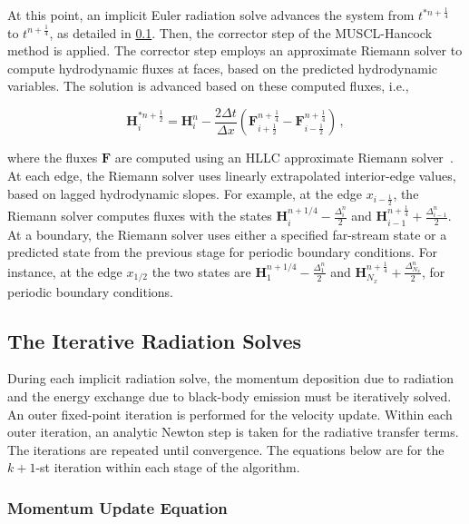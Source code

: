 \documentclass[preprint,12pt]{elsarticle}
\newcommand{\pec}{\, ,}
\newcommand{\half}{\frac{1}{2}}
\newcommand{\fourth}{\frac{1}{4}}
\renewcommand{\H}{\mathbf{H}}
\newcommand{\Flux}{\mathbf{F}}
\newcommand{\dt}{\Delta t}
\newcommand{\dx}{\Delta x}
\newcommand{\hydroCorrector}[5]{
\begin{equation}#5
  \H_i^{#3} = \H_i^{#1} - \frac{#4\dt}{\dx}
  \left(\Flux_{i+\half}^{#2} - \Flux_{i-\half}^{#2}\right) \pec
\end{equation}
}
\begin{document}
At this point, an implicit Euler radiation solve advances the system from $t^{*n+\fourth}$
to $t^{n+\fourth}$, as detailed in \ref{sec:rad_solves}.  Then, the corrector step of the
MUSCL-Hancock method is applied.  The corrector step employs an approximate Riemann solver
to compute hydrodynamic fluxes at faces, based on the predicted hydrodynamic variables.  The solution is
advanced based on these computed fluxes, i.e.,
\hydroCorrector{n}{n+\fourth}{*n+\half}{2}{\label{eq:muscl_corrector}}
where the fluxes $\mathbf{F}$ are computed using an HLLC approximate Riemann solver~\cite{toro}.  At
each edge, the Riemann solver uses linearly extrapolated interior-edge values, based on lagged
hydrodynamic slopes.  For example, at the edge
$x_{i-\half}$, the Riemann solver computes fluxes with the states
$\H_{i}^{n+1/4}-\frac{\Delta_i^n}{2}$ and $\H_{i-1}^{n+\fourth}+\frac{\Delta_{i-1}^n}{2}$.  At a boundary,
the Riemann solver uses either a specified far-stream state or a predicted state from the previous stage for periodic boundary conditions.  For instance,
at the edge $x_{1/2}$ the two states are $\H_{1}^{n+1/4} - \frac{\Delta_1^n}{2}$ and
$\H_{N_x}^{n+\fourth}+\frac{\Delta_{N_x}^{n}}{2}$, for periodic 
boundary conditions.

\subsection{The Iterative Radiation Solves}
\label{sec:rad_solves}

During each implicit radiation solve, the momentum deposition due to radiation and the
energy exchange due to black-body emission must be iteratively solved.  An outer fixed-point
iteration is performed for the velocity update.  Within each outer iteration, an analytic
Newton step is taken for the radiative transfer terms.  The iterations are repeated until 
convergence.  The equations below are for the $k+1$-st iteration within
each stage of the algorithm. 

\subsubsection{Momentum Update Equation}
\end{document}
